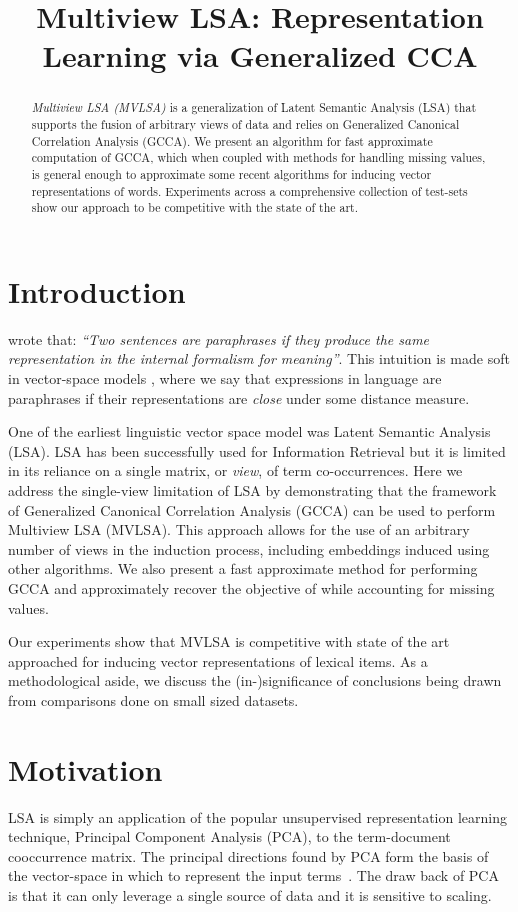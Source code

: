 \documentclass[11pt]{article}
\title{Multiview LSA: Representation Learning via Generalized CCA}
\date{}
\begin{document}
\maketitle
\begin{abstract}
  \emph{Multiview LSA (MVLSA)} is a generalization of Latent Semantic
  Analysis (LSA) that supports the  
  fusion of arbitrary views of data and relies on Generalized Canonical Correlation
  Analysis (GCCA). We present an algorithm
  for fast approximate computation of GCCA, which when coupled with methods
  for handling missing values, is general enough to approximate
  some recent algorithms for inducing vector representations of
  words. Experiments across a comprehensive 
  collection of test-sets show our approach to be competitive with the
  state of the art.   
\end{abstract}

\section{Introduction}
 wrote that: \emph{``Two sentences
  are paraphrases if they produce the same representation in the
  internal formalism for meaning''}.  This intuition is made soft in
vector-space models \cite{turney2010frequency}, where we say that
expressions in language are paraphrases if
their representations are \emph{close} under some distance measure.

One of the earliest linguistic vector space model was Latent
Semantic Analysis (LSA). LSA has been successfully used 
for Information Retrieval but it is limited in its
reliance on a single matrix, or \emph{view}, of term co-occurrences.
Here we address the single-view limitation of LSA by demonstrating
that the framework of Generalized Canonical Correlation Analysis
(GCCA) can be used to perform Multiview LSA (MVLSA). This
approach allows for the use of an arbitrary number of views in the
induction process, including embeddings induced using other
algorithms. We also present a fast approximate method for performing
GCCA and approximately recover the objective of
\cite{pennington2014glove} while accounting for missing values. 

Our experiments show that MVLSA is competitive with state of the art
approached for inducing vector representations of lexical items.
As a methodological aside, we discuss the (in-)significance of
conclusions being drawn from comparisons done on small sized datasets.

\section{Motivation} 
LSA is simply an application of the popular unsupervised representation
learning technique, Principal Component Analysis (PCA), to the
term-document cooccurrence matrix.  
The principal directions found by PCA form the basis of the
vector-space in which to represent the input
terms~\cite{landauer1997solution}. The draw back of PCA is that it can
only leverage a single source of data and it is sensitive to scaling.
\end{document}
